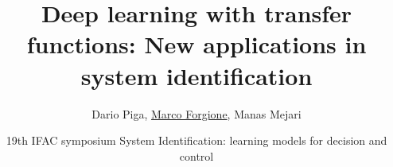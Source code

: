 \usepackage[english]{babel}
\usepackage{amsmath}
\usepackage[latin1]{inputenc}
\usepackage{units}
\usepackage{colortbl}
\usepackage{multimedia}
\usepackage{bm}
\usepackage{subcaption}
\usepackage{algorithm2e}
\usepackage{algorithmic}

{
}
	

\title[Dynamical systems \& deep learning]{{Deep learning with transfer functions: New applications in system identification}}


\author[]{Dario Piga, \underline{Marco Forgione}, Manas Mejari}



\date[]{19th IFAC symposium System Identification: learning models for decision and control}


\subject{System Identification, Deep Learning, Machine Learning, Regularization}


\newcommand{\So}{S_o} %
\newcommand{\hidden}[1]{\overline{#1}}
\newcommand{\nsamp}{N}
\newcommand{\Yid}{Y}
\newcommand{\Uid}{U}
\newcommand{\Did}{{\mathcal{D}}}
\newcommand{\tens}[1]{\bm{#1}}

\newcommand{\batchsize}{q}
\newcommand{\seqlen}{m}
\newcommand{\nin}{n_u} 
\newcommand{\ny}{n_y} 
\newcommand{\nx}{n_x}

\newcommand{\NN}{\mathcal{N}} %

\newcommand{\norm}[1]{\left \lVert #1 \right \rVert}
\DeclareMathOperator*\argmin{arg \, min}
\newcommand{\Name}{\emph{dynoNet}}


\newcommand{\q}{q} %
\newcommand{\A}{A} %
\newcommand{\ac}{a} %
\newcommand{\B}{B} %
\newcommand{\bb}{b} %
\newcommand{\Gmat}{\mathbb{G}} %
\newcommand{\tvec}[1]{\bm{#1}}
\newcommand{\mat}[1]{\bm{#1}}
\newcommand{\sens}[1]{\tilde{#1}}
\newcommand{\adjoint}[1]{\overline{#1}}
\newcommand{\loss}{\mathcal{L}}
\newcommand{\pdiff}[2]{\frac{\partial #1}{\partial #2}}

\newcommand{\conv}{*}
\newcommand{\ccorr}{\star}
